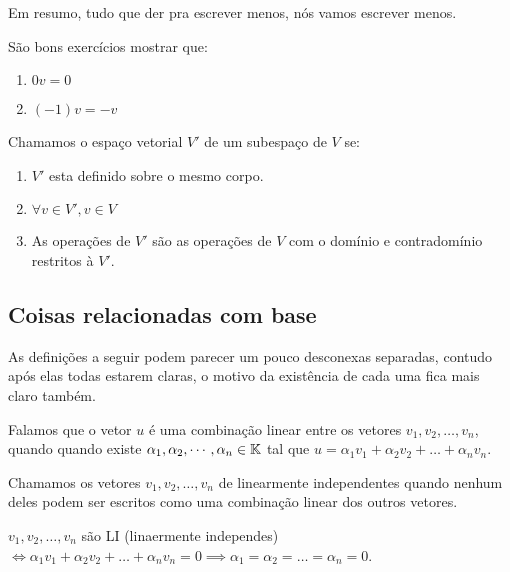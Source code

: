 Em resumo, tudo que der pra escrever menos, nós vamos escrever menos.

São bons exercícios mostrar que:

\begin{enumerate}
    \item $0v=0$
    \item $(-1)v = -v$
\end{enumerate}

\begin{defn}

Chamamos o espaço vetorial $V'$ de um subespaço de $V$ se: 
\begin{enumerate}
    \item $V'$ esta definido sobre o mesmo corpo.
    \item $\forall v \in V', v \in V$
    \item As operações de $V'$ são as operações de $V$ com o domínio e contradomínio restritos à $V'$. 
    
%    
%    
\end{enumerate}
\end{defn}

\subsection{Coisas relacionadas com base}

As  definições a seguir podem parecer um pouco desconexas separadas, contudo após elas todas estarem claras, o motivo da existência de cada uma fica mais claro também.


\begin{defn}
Falamos que o vetor $u$  é uma combinação linear entre os vetores $v_1,v_2,\allowbreak\dots,v_n$, quando quando existe $\alpha_1, \alpha_2, \cdots , \alpha_n \in \mathbb{K}$ tal que $u = \alpha_1v_1 + \alpha_2v_2 +\dots + \alpha_nv_n $.
\end{defn}

\begin{defn}
Chamamos os vetores $v_1,v_2, \dots, v_n$ de linearmente independentes quando nenhum deles podem ser escritos como uma combinação linear dos outros vetores.
\end{defn}

\begin{cor}
$v_1,v_2, \dots, v_n$ são LI (linaermente independes) $\iff \alpha_1v_1 + \alpha_2v_2 +\dots + \alpha_nv_n = 0 \implies \alpha_1 = \alpha_2 = \dots = \alpha_n =0$.
\end{cor}

